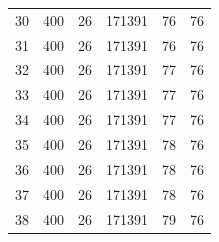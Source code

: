 \documentclass[11pt,a4paper]{article}
\theoremstyle{definition}
\theoremstyle{remark}
\begin{document}
\begin{center}
\begin{tabular}{@{}rrrrrr@{}}
30 & 400 & 26 & 171391 & 76 & 76 \\
31 & 400 & 26 & 171391 & 76 & 76 \\
32 & 400 & 26 & 171391 & 77 & 76 \\
33 & 400 & 26 & 171391 & 77 & 76 \\
34 & 400 & 26 & 171391 & 77 & 76 \\
35 & 400 & 26 & 171391 & 78 & 76 \\
36 & 400 & 26 & 171391 & 78 & 76 \\
37 & 400 & 26 & 171391 & 78 & 76 \\
38 & 400 & 26 & 171391 & 79 & 76 \\
\bottomrule
\end{tabular}
\end{center}
\end{document}

